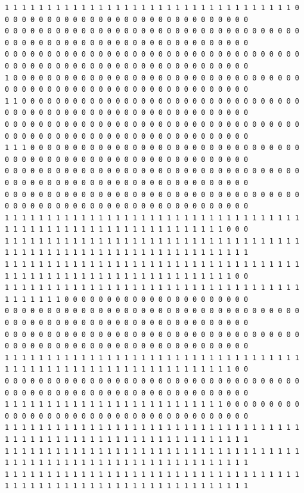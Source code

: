 \documentclass [10 pt, a4 paper]{report}
\begin{document}
\begin{lstlisting}[caption=Output of the simulation once it is finished, label={lst:code1}, frame=single]
1 1 1 1 1 1 1 1 1 1 1 1 1 1 1 1 1 1 1 1 1 1 1 1 1 1 1 1 1 1 1 1 1 1 0 0 0 0 0 0 0 0 0 0 0 0 0 0 0 0 0 0 0 0 0 0 0 0 0 0 0 0 0 0
0 0 0 0 0 0 0 0 0 0 0 0 0 0 0 0 0 0 0 0 0 0 0 0 0 0 0 0 0 0 0 0 0 0 0 0 0 0 0 0 0 0 0 0 0 0 0 0 0 0 0 0 0 0 0 0 0 0 0 0 0 0 0 0
0 0 0 0 0 0 0 0 0 0 0 0 0 0 0 0 0 0 0 0 0 0 0 0 0 0 0 0 0 0 0 0 0 0 0 0 0 0 0 0 0 0 0 0 0 0 0 0 0 0 0 0 0 0 0 0 0 0 0 0 0 0 0 0
1 0 0 0 0 0 0 0 0 0 0 0 0 0 0 0 0 0 0 0 0 0 0 0 0 0 0 0 0 0 0 0 0 0 0 0 0 0 0 0 0 0 0 0 0 0 0 0 0 0 0 0 0 0 0 0 0 0 0 0 0 0 0 0
1 1 0 0 0 0 0 0 0 0 0 0 0 0 0 0 0 0 0 0 0 0 0 0 0 0 0 0 0 0 0 0 0 0 0 0 0 0 0 0 0 0 0 0 0 0 0 0 0 0 0 0 0 0 0 0 0 0 0 0 0 0 0 0
0 0 0 0 0 0 0 0 0 0 0 0 0 0 0 0 0 0 0 0 0 0 0 0 0 0 0 0 0 0 0 0 0 0 0 0 0 0 0 0 0 0 0 0 0 0 0 0 0 0 0 0 0 0 0 0 0 0 0 0 0 0 0 0
1 1 1 0 0 0 0 0 0 0 0 0 0 0 0 0 0 0 0 0 0 0 0 0 0 0 0 0 0 0 0 0 0 0 0 0 0 0 0 0 0 0 0 0 0 0 0 0 0 0 0 0 0 0 0 0 0 0 0 0 0 0 0 0
0 0 0 0 0 0 0 0 0 0 0 0 0 0 0 0 0 0 0 0 0 0 0 0 0 0 0 0 0 0 0 0 0 0 0 0 0 0 0 0 0 0 0 0 0 0 0 0 0 0 0 0 0 0 0 0 0 0 0 0 0 0 0 0
0 0 0 0 0 0 0 0 0 0 0 0 0 0 0 0 0 0 0 0 0 0 0 0 0 0 0 0 0 0 0 0 0 0 0 0 0 0 0 0 0 0 0 0 0 0 0 0 0 0 0 0 0 0 0 0 0 0 0 0 0 0 0 0
1 1 1 1 1 1 1 1 1 1 1 1 1 1 1 1 1 1 1 1 1 1 1 1 1 1 1 1 1 1 1 1 1 1 1 1 1 1 1 1 1 1 1 1 1 1 1 1 1 1 1 1 1 1 1 1 1 1 1 1 1 0 0 0
1 1 1 1 1 1 1 1 1 1 1 1 1 1 1 1 1 1 1 1 1 1 1 1 1 1 1 1 1 1 1 1 1 1 1 1 1 1 1 1 1 1 1 1 1 1 1 1 1 1 1 1 1 1 1 1 1 1 1 1 1 1 1 1
1 1 1 1 1 1 1 1 1 1 1 1 1 1 1 1 1 1 1 1 1 1 1 1 1 1 1 1 1 1 1 1 1 1 1 1 1 1 1 1 1 1 1 1 1 1 1 1 1 1 1 1 1 1 1 1 1 1 1 1 1 1 0 0
1 1 1 1 1 1 1 1 1 1 1 1 1 1 1 1 1 1 1 1 1 1 1 1 1 1 1 1 1 1 1 1 1 1 1 1 1 1 1 1 1 1 0 0 0 0 0 0 0 0 0 0 0 0 0 0 0 0 0 0 0 0 0 0
0 0 0 0 0 0 0 0 0 0 0 0 0 0 0 0 0 0 0 0 0 0 0 0 0 0 0 0 0 0 0 0 0 0 0 0 0 0 0 0 0 0 0 0 0 0 0 0 0 0 0 0 0 0 0 0 0 0 0 0 0 0 0 0
0 0 0 0 0 0 0 0 0 0 0 0 0 0 0 0 0 0 0 0 0 0 0 0 0 0 0 0 0 0 0 0 0 0 0 0 0 0 0 0 0 0 0 0 0 0 0 0 0 0 0 0 0 0 0 0 0 0 0 0 0 0 0 0
1 1 1 1 1 1 1 1 1 1 1 1 1 1 1 1 1 1 1 1 1 1 1 1 1 1 1 1 1 1 1 1 1 1 1 1 1 1 1 1 1 1 1 1 1 1 1 1 1 1 1 1 1 1 1 1 1 1 1 1 1 1 0 0
0 0 0 0 0 0 0 0 0 0 0 0 0 0 0 0 0 0 0 0 0 0 0 0 0 0 0 0 0 0 0 0 0 0 0 0 0 0 0 0 0 0 0 0 0 0 0 0 0 0 0 0 0 0 0 0 0 0 0 0 0 0 0 0
1 1 1 1 1 1 1 1 1 1 1 1 1 1 1 1 1 1 1 1 1 1 1 1 1 1 0 0 0 0 0 0 0 0 0 0 0 0 0 0 0 0 0 0 0 0 0 0 0 0 0 0 0 0 0 0 0 0 0 0 0 0 0 0
1 1 1 1 1 1 1 1 1 1 1 1 1 1 1 1 1 1 1 1 1 1 1 1 1 1 1 1 1 1 1 1 1 1 1 1 1 1 1 1 1 1 1 1 1 1 1 1 1 1 1 1 1 1 1 1 1 1 1 1 1 1 1 1
1 1 1 1 1 1 1 1 1 1 1 1 1 1 1 1 1 1 1 1 1 1 1 1 1 1 1 1 1 1 1 1 1 1 1 1 1 1 1 1 1 1 1 1 1 1 1 1 1 1 1 1 1 1 1 1 1 1 1 1 1 1 1 1
1 1 1 1 1 1 1 1 1 1 1 1 1 1 1 1 1 1 1 1 1 1 1 1 1 1 1 1 1 1 1 1 1 1 1 1 1 1 1 1 1 1 1 1 1 1 1 1 1 1 1 1 1 1 1 1 1 1 1 1 1 1 1 1

\end{lstlisting}
\end{document}
